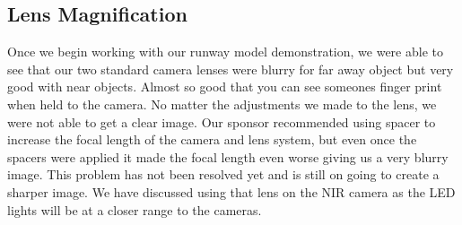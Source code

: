 \documentclass[letterpaper,10pt,titlepage]{IEEEtran}
\begin{document}
   \subsection{Lens Magnification}
   Once we begin working with our runway model demonstration, we were able to see that our two standard camera lenses were blurry for far away object but very good with near objects. Almost so good that you can see someones finger print when held to the camera. No matter the adjustments we made to the lens, we were not able to get a clear image. Our sponsor recommended using spacer to increase the focal length of the camera and lens system, but even once the spacers were applied it made the focal length even worse giving us a very blurry image. This problem has not been resolved yet and is still on going to create a sharper image. We have discussed using that lens on the NIR camera as the LED lights will be at a closer range to the cameras. 
   
\end{document}
